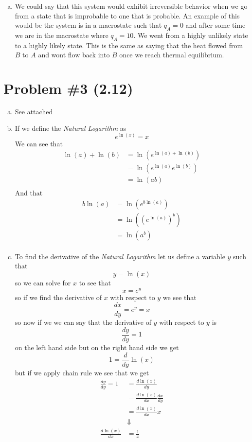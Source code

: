 \documentclass[11pt]{article}
\numberwithin{equation}{section}
\begin{document}
\begin{enumerate}[(a)]
\item
We could say that this system would exhibit irreversible behavior when we go from a state that is improbable to one that is probable. An example of this would be the system is in a macrostate such that $q_A=0$ and after some time we are in the macrostate where $q_A=10$. We went from a highly unlikely state to a highly likely state. This is the same as saying that the heat flowed from $B$ to $A$ and wont flow back into $B$ once we reach thermal equilibrium.
\end{enumerate}

\section{Problem \#3 (2.12)}
\begin{enumerate}[(a)]
\item
See attached

\item
If we define the \emph{Natural Logarithm} as 
$$e^{\ln(x)} = x$$
We can see that
\begin{align*}
\ln(a)+\ln(b) &=  \ln\left(e^{\ln(a)+\ln(b)}\right)\\
&=  \ln\left(e^{\ln(a)}e^{\ln(b)}\right)\\
&=  \ln\left(ab\right)\\
\end{align*}
And that 
\begin{align*}
b\ln(a) &= \ln\left(e^{b\ln(a)}\right)\\
&= \ln\left(\left(e^{\ln(a)}\right)^b\right)\\
&= \ln\left(a^b\right)\\
\end{align*}

\item
To find the derivative of the \emph{Natural Logarithm} let us define a variable $y$ such that
$$y = \ln(x)$$
so we can solve for $x$ to see that
$$x = e^y$$
so if we find the derivative of $x$ with respect to $y$ we see that
$$\frac{dx}{dy} = e^y = x$$
so now if we we can say that the derivative of $y$ with respect to $y$ is 
$$\frac{dy}{dy} = 1$$
on the left hand side but on the right hand side we get
$$1 = \frac{d}{dy}\ln(x)$$
but if we apply chain rule we see that we get
\begin{align*}
\frac{dy}{dy} = 1 &= \frac{d\ln(x)}{dy}\\
&= \frac{d\ln(x)}{dx}\frac{dx}{dy}\\
&= \frac{d\ln(x)}{dx}x\\
&\Downarrow\\
\frac{d\ln(x)}{dx} &= \frac{1}{x}
\end{align*}


\end{enumerate}
\end{document}
